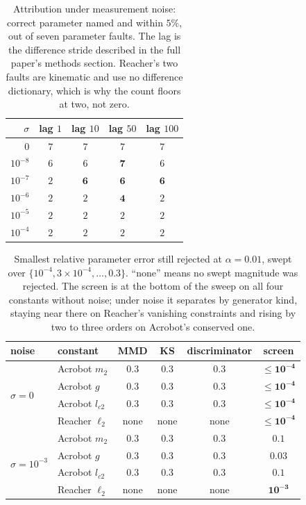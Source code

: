 \documentclass{article}
\begin{document}
\begin{table}[t]
\caption{Attribution under measurement noise: correct parameter named and
within $5\%$, out of seven parameter faults. The lag is the difference stride described in the full paper's methods section. Reacher's two faults are kinematic and use no
difference dictionary, which is why the count floors at two, not zero.}
\label{tab:attrnoise}
\begin{center}
\small
\begin{tabular}{r|cccc}
$\sigma$ & lag $1$ & lag $10$ & lag $50$ & lag $100$ \\
\hline
$0$        & $7$ & $7$ & $7$ & $7$ \\
$10^{-8}$  & $6$ & $6$ & $\mathbf{7}$ & $6$ \\
$10^{-7}$  & $2$ & $\mathbf{6}$ & $\mathbf{6}$ & $\mathbf{6}$ \\
$10^{-6}$  & $2$ & $2$ & $\mathbf{4}$ & $2$ \\
$10^{-5}$  & $2$ & $2$ & $2$ & $2$ \\
$10^{-4}$  & $2$ & $2$ & $2$ & $2$ \\
\end{tabular}
\end{center}
\end{table}

\begin{table}[t]
\caption{Smallest relative parameter error still rejected at $\alpha = 0.01$,
swept over $\{10^{-4}, 3\times10^{-4}, \dots, 0.3\}$. ``none'' means no swept
magnitude was rejected. The screen is at the bottom of the sweep on all four
constants without noise; under noise it separates by generator kind, staying
near there on Reacher's vanishing constraints and rising by two to three orders
on Acrobot's conserved one.}
\label{tab:floor}
\begin{center}
\small
\begin{tabular}{llcccc}
noise & constant & MMD & KS & discriminator & \textbf{screen} \\
\hline
\multirow{4}{*}{$\sigma = 0$}
 & Acrobot $m_2$    & $0.3$ & $0.3$ & $0.3$ & $\mathbf{\le 10^{-4}}$ \\
 & Acrobot $g$      & $0.3$ & $0.3$ & $0.3$ & $\mathbf{\le 10^{-4}}$ \\
 & Acrobot $l_{c2}$ & $0.3$ & $0.3$ & $0.3$ & $\mathbf{\le 10^{-4}}$ \\
 & Reacher $\ell_2$ & none & none & none & $\mathbf{\le 10^{-4}}$ \\
\hline
\multirow{4}{*}{$\sigma = 10^{-3}$}
 & Acrobot $m_2$    & $0.3$ & $0.3$ & $0.3$ & $\mathbf{0.1}$ \\
 & Acrobot $g$      & $0.3$ & $0.3$ & $0.3$ & $\mathbf{0.03}$ \\
 & Acrobot $l_{c2}$ & $0.3$ & $0.3$ & $0.3$ & $\mathbf{0.1}$ \\
 & Reacher $\ell_2$ & none & none & none & $\mathbf{10^{-3}}$ \\
\end{tabular}
\end{center}
\end{table}
\end{document}

